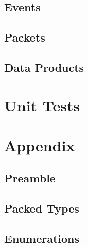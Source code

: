 

\subsection{Events}



\subsection{Packets}



\subsection{Data Products}



\section{Unit Tests}



\section{Appendix}
\subsection{Preamble}



\subsection{Packed Types}



\subsection{Enumerations}




